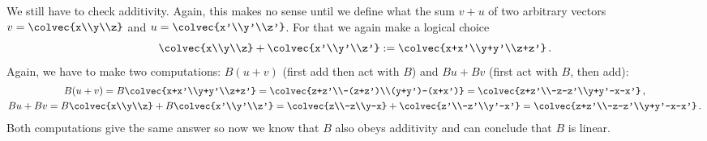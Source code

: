 \begin{example}
We still have to check additivity. Again, this makes no sense until we define what the sum $v+u$ of two arbitrary vectors $v=\colvec{x\\y\\z}$ 
and $u=\colvec{x'\\y'\\z'}$. For that we again make a logical choice
\[
\colvec{x\\y\\z}+\colvec{x'\\y'\\z'}:=\colvec{x+x'\\y+y'\\z+z'}\, .
\]
Again, we have to make two computations: $B(u+v)$ (first add then act with $B$) and $Bu+Bv$ (first act with $B$, then add):
\begin{gather*}
B(u+v)=B\colvec{x+x'\\y+y'\\z+z'}=\colvec{z+z'\\-(z+z')\\(y+y')-(x+x')}=\colvec{z+z'\\-z-z'\\y+y'-x-x'}\, ,
\\
Bu+Bv=B\colvec{x\\y\\z}+B\colvec{x'\\y'\\z'}=\colvec{z\\-z\\y-x}+\colvec{z'\\-z'\\y'-x'}=\colvec{z+z'\\-z-z'\\y+y'-x-x'}\, .
\end{gather*}
Both computations give the same answer so now we know that $B$ also obeys additivity and can conclude that $B$ is linear.

\end{example}
